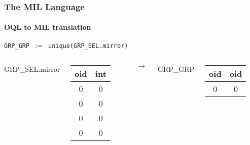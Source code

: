 \documentclass{beamer}
\begin{document}
\begin{frame}
  \frametitle{The MIL Language}
  \framesubtitle{OQL to MIL translation}

  \begin{block}{}
  {\tt GRP\_GRP $:=$ unique(GRP\_SEL.mirror)}
  \end{block}

  \begin{columns}

  \column{1cm}

  GRP\_SEL.mirror
  \begin{tabular}{|c|c|}
    \hline
    oid & int \\
    \hline
    0 & 0 \\
    0 & 0 \\
    0 & 0 \\
    0 & 0 \\
    \hline
  \end{tabular}

  \column{1cm}

  $\longrightarrow$

  \column{1cm}

  GRP\_GRP
  \begin{tabular}{|c|c|}
    \hline
    oid & oid \\
    \hline
    0 & 0 \\
    \hline
  \end{tabular}

  \end{columns}

\end{frame}
\end{document}
